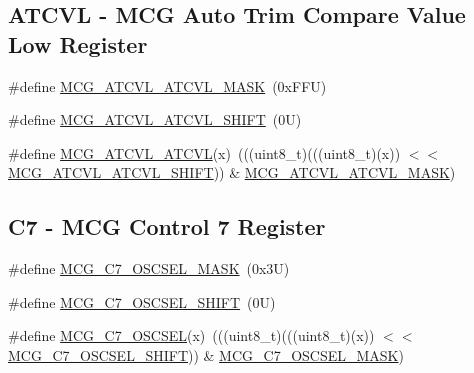 \subsection*{A\+T\+C\+VL -\/ M\+CG Auto Trim Compare Value Low Register}
\begin{DoxyCompactItemize}
\item 
\#define \mbox{\hyperlink{group___m_c_g___register___masks_ga48750526150212b524f731e303a7e3cf}{M\+C\+G\+\_\+\+A\+T\+C\+V\+L\+\_\+\+A\+T\+C\+V\+L\+\_\+\+M\+A\+SK}}~(0x\+F\+F\+U)
\item 
\#define \mbox{\hyperlink{group___m_c_g___register___masks_ga9e3e0eab24aaf1bf2905ae0cf4803eb3}{M\+C\+G\+\_\+\+A\+T\+C\+V\+L\+\_\+\+A\+T\+C\+V\+L\+\_\+\+S\+H\+I\+FT}}~(0\+U)
\item 
\#define \mbox{\hyperlink{group___m_c_g___register___masks_ga124aa7c8cc26cfd1c06a278add1a0d21}{M\+C\+G\+\_\+\+A\+T\+C\+V\+L\+\_\+\+A\+T\+C\+VL}}(x)~(((uint8\+\_\+t)(((uint8\+\_\+t)(x)) $<$$<$ \mbox{\hyperlink{group___m_c_g___register___masks_ga9e3e0eab24aaf1bf2905ae0cf4803eb3}{M\+C\+G\+\_\+\+A\+T\+C\+V\+L\+\_\+\+A\+T\+C\+V\+L\+\_\+\+S\+H\+I\+FT}})) \& \mbox{\hyperlink{group___m_c_g___register___masks_ga48750526150212b524f731e303a7e3cf}{M\+C\+G\+\_\+\+A\+T\+C\+V\+L\+\_\+\+A\+T\+C\+V\+L\+\_\+\+M\+A\+SK}})
\end{DoxyCompactItemize}
\subsection*{C7 -\/ M\+CG Control 7 Register}
\begin{DoxyCompactItemize}
\item 
\#define \mbox{\hyperlink{group___m_c_g___register___masks_ga8f29d6e2e3ddd8725de2ea86d8f0548f}{M\+C\+G\+\_\+\+C7\+\_\+\+O\+S\+C\+S\+E\+L\+\_\+\+M\+A\+SK}}~(0x3\+U)
\item 
\#define \mbox{\hyperlink{group___m_c_g___register___masks_ga36e349718cb5e8af96efea408f059dcb}{M\+C\+G\+\_\+\+C7\+\_\+\+O\+S\+C\+S\+E\+L\+\_\+\+S\+H\+I\+FT}}~(0\+U)
\item 
\#define \mbox{\hyperlink{group___m_c_g___register___masks_gac1a1e06d2189b74b5587b53d3104cb4a}{M\+C\+G\+\_\+\+C7\+\_\+\+O\+S\+C\+S\+EL}}(x)~(((uint8\+\_\+t)(((uint8\+\_\+t)(x)) $<$$<$ \mbox{\hyperlink{group___m_c_g___register___masks_ga36e349718cb5e8af96efea408f059dcb}{M\+C\+G\+\_\+\+C7\+\_\+\+O\+S\+C\+S\+E\+L\+\_\+\+S\+H\+I\+FT}})) \& \mbox{\hyperlink{group___m_c_g___register___masks_ga8f29d6e2e3ddd8725de2ea86d8f0548f}{M\+C\+G\+\_\+\+C7\+\_\+\+O\+S\+C\+S\+E\+L\+\_\+\+M\+A\+SK}})
\end{DoxyCompactItemize}
